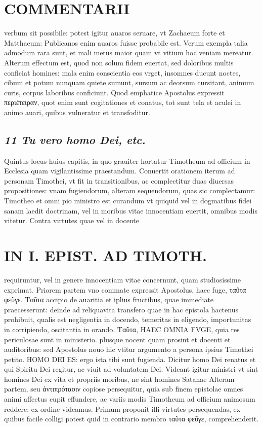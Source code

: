 \documentclass{article}
\begin{document}
\begin{pages}
\section*{COMMENTARII }
\marginpar{[ p.158 ]}\pstart verbum sit possibile: potest igitur auaros seruare, vt Zachaeum forte et Matthaeum: Publicanos enim auaros fuisse probabile est. Verum exempla talia admodum rara sunt, et mali metus maior quam vt vitium hoc veniam mereatur.  \pend\pstart Alterum effectum est, quod non solum fidem euertat, sed doloribus multis conficiat homines: mala enim conscientia eos vrget, insomnes ducunt noctes, cibum et potum nunquam quiete sumunt, sursum ac deorsum cursitant, animum curis, corpus laboribus conficiunt. Quod emphatice Apostolus expressit περιέτειραν, quot enim sunt cogitationes et conatus, tot sunt tela et aculei in animo auari, quibus vulneratur et transfoditur.  \pend
{}
{}
\subsection*{\textit{11 Tu vero homo Dei, etc. }}\pstart Quintus locus huius capitis, in quo grauiter hortatur Timotheum ad officium in Ecclesia quam vigilantissime praestandum. Conuertit orationem iterum ad personam Timothei, vt fit in transitionibus, ac complectitur duas diuersas propositiones: vnam fugiendorum, alteram sequendorum, quas sic complectamur: Timotheo et omni pio ministro est curandum vt quiquid vel in dogmatibus fidei sanam laedit doctrinam, vel in moribus vitae innocentiam euertit, omnibus modis vitetur. Contra virtutes quae vel in docente  \pend
\section*{IN I. EPIST. AD TIMOTH. }
\marginpar{[ p.159 ]}\pstart requiruntur, vel in genere innocentiam vitae concernunt, quam studiosissime exprimat. Priorem partem vno commate expressit Apostolus, haec fuge, ταῦτα φεῦγε. Ταῦτα accipio de auaritia et iplius fructibus, quae immediate praecesserunt: deinde ad reliquavita transfero quae in hac epistola hactenus prohibuit, qualis est negligentia in docendo, temeritas in eligendo, importunitas in corripiendo, oscitantia in orando. Ταῦτα, HAEC OMNIA FVGE, quia res periculosae sunt in ministerio. plusque nocent quam prosint et docenti et auditoribus: sed Apostolus nouo hic vtitur argumento a persona ipsius Timothei petito. HOMO DEI ES: ergo ista tibi sunt fugienda. Dicitur homo Dei renatus et qui Spiritu Dei regitur, ac viuit ad voluntatem Dei.  \pend\pstart Videant igitur ministri vt sint homines Dei ex vita et propriis moribus, ne sint homines Satanae  \pend\pstart Alteram partem, seu ἀντιπρότασιν copiose persequitur, quia sub finem epistolae omnes animi affectus cupit effundere, ac variis modis Timotheum ad officium animosum reddere: ex ordine videamus.  \pend\pstart Primum proponit illi virtutes persequendas, ex quibus facile colligi potest quid in contrario membro ταῦτα φεῦγε, comprehenderit.  \pend

\end{pages}
\end{document}
